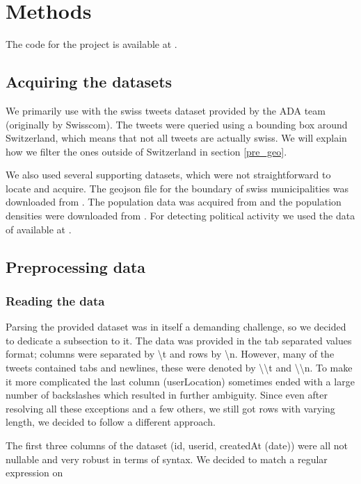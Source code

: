 \section{Methods}

The code for the project is available at  \cite{project_repo}.

\subsection{Acquiring the datasets}

We primarily use with the swiss tweets dataset provided by the ADA team (originally by Swisscom). The tweets were queried using a bounding box around Switzerland, which means that not all tweets are actually swiss. We will explain how we filter the ones outside of Switzerland in section \ref{pre_geo}.

We also used several supporting datasets, which were not straightforward to locate and acquire. The geojson file for the boundary of swiss municipalities was downloaded from \cite{swiss_geo}. The population data was acquired from \cite{pop_data} and the population densities were downloaded from \cite{swiss_pop_density}. For detecting political activity we used the data of \cite{tw_useful} available at \cite{swiss_political_users}.
\subsection{Preprocessing data}

\subsubsection{Reading the data}

Parsing the provided dataset was in itself a demanding challenge, so we decided to dedicate a subsection to it. The data was provided in the tab separated values format; columns were separated by \textbackslash t and rows by \textbackslash n. However, many of the tweets contained tabs and newlines, these were denoted by \textbackslash\textbackslash t and \textbackslash\textbackslash n. To make it more complicated the last column (userLocation) sometimes ended with a large number of backslashes which resulted in further ambiguity. Since even after resolving all these exceptions and a few others, we still got rows with varying  length, we decided to follow a different approach.

The first three columns of the dataset (id, userid, createdAt (date)) were all not nullable and very robust in terms of syntax. We decided to match a regular expression on


